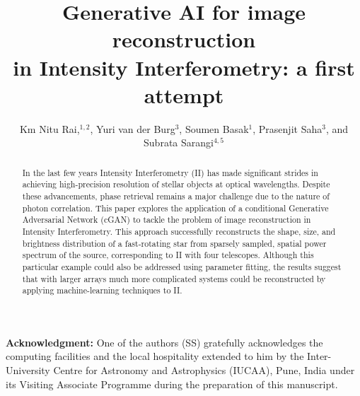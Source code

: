 \documentclass[twocolumn]{emulateapj}
\begin{document}
\title{Generative AI for image reconstruction\\ in Intensity Interferometry: a first attempt}

\author{Km Nitu Rai,$^{1,2}$, Yuri van der Burg$^{3}$, Soumen
  Basak$^{1}$, Prasenjit Saha$^{3}$, and Subrata Sarangi$^{4,5}$}






\begin{abstract}
In the last few years Intensity Interferometry (II) has made significant strides in achieving high-precision resolution of stellar objects at optical wavelengths. Despite these advancements, phase retrieval remains a major challenge due to the nature of photon correlation. This paper explores the application of a conditional Generative Adversarial Network (cGAN) to tackle the problem of image reconstruction in Intensity Interferometry. This approach successfully reconstructs the shape, size, and brightness distribution of a fast-rotating star from sparsely sampled, spatial power spectrum of the source, corresponding to II with four telescopes.  Although this particular example could also be addressed using parameter fitting, the results suggest that with larger arrays much more complicated systems could be reconstructed by applying machine-learning techniques to II.
\end{abstract}

\maketitle







\begin{acknowledgements}
\textbf{Acknowledgment:} One of the authors (SS) gratefully acknowledges the computing facilities and the local hospitality extended to him by the Inter-University Centre for Astronomy and Astrophysics (IUCAA), Pune, India under its Visiting Associate Programme during the preparation of this manuscript.
\end{acknowledgements}



\end{document}
